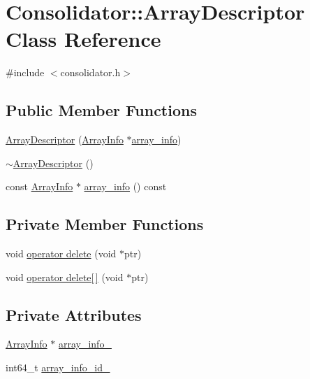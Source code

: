 \hypertarget{classConsolidator_1_1ArrayDescriptor}{}\section{Consolidator\+:\+:Array\+Descriptor Class Reference}
\label{classConsolidator_1_1ArrayDescriptor}


{\ttfamily \#include $<$consolidator.\+h$>$}

\subsection*{Public Member Functions}
\begin{DoxyCompactItemize}
\item 
\hyperlink{classConsolidator_1_1ArrayDescriptor_a45c9a7091ce90a9ad423dabdb8453dd7}{Array\+Descriptor} (\hyperlink{structConsolidator_1_1ArrayInfo}{Array\+Info} $\ast$\hyperlink{classConsolidator_1_1ArrayDescriptor_af8fd69c78ba096b8f0068e0eb8619527}{array\+\_\+info})
\item 
\hyperlink{classConsolidator_1_1ArrayDescriptor_a576c21fcc3a335e5c1b7a218c7328fcf}{$\sim$\+Array\+Descriptor} ()
\item 
const \hyperlink{structConsolidator_1_1ArrayInfo}{Array\+Info} $\ast$ \hyperlink{classConsolidator_1_1ArrayDescriptor_af8fd69c78ba096b8f0068e0eb8619527}{array\+\_\+info} () const 
\end{DoxyCompactItemize}
\subsection*{Private Member Functions}
\begin{DoxyCompactItemize}
\item 
void \hyperlink{classConsolidator_1_1ArrayDescriptor_ab061edefa56dedde0d0873f763f3d3a9}{operator delete} (void $\ast$ptr)
\item 
void \hyperlink{classConsolidator_1_1ArrayDescriptor_ada344bf0f46ceeee29e871a2325a7820}{operator delete\mbox{[}$\,$\mbox{]}} (void $\ast$ptr)
\end{DoxyCompactItemize}
\subsection*{Private Attributes}
\begin{DoxyCompactItemize}
\item 
\hyperlink{structConsolidator_1_1ArrayInfo}{Array\+Info} $\ast$ \hyperlink{classConsolidator_1_1ArrayDescriptor_a9c844c4804ec3effce4bb9c0cb89dd4c}{array\+\_\+info\+\_\+}
\item 
int64\+\_\+t \hyperlink{classConsolidator_1_1ArrayDescriptor_a6c4666c014b3f10145e678e1a3fb2de0}{array\+\_\+info\+\_\+id\+\_\+}
\end{DoxyCompactItemize}
